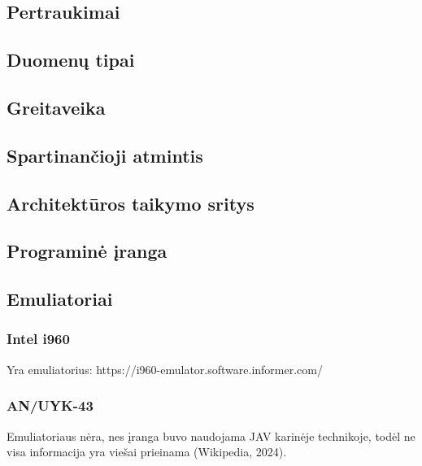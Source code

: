 \documentclass{article}
\begin{document}
\subsection{Pertraukimai}
\subsection{Duomenų tipai}
\subsection{Greitaveika}
\subsection{Spartinančioji atmintis}
\subsection{Architektūros taikymo sritys}
\subsection{Programinė įranga}
\subsection{Emuliatoriai}
\subsubsection{Intel i960}
Yra emuliatorius: https://i960-emulator.software.informer.com/
\subsubsection{AN/UYK-43}
Emuliatoriaus nėra, nes įranga buvo naudojama JAV karinėje technikoje, todėl ne visa informacija yra viešai prieinama (Wikipedia, 2024).
\end{document}
